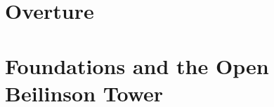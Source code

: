 \documentclass[11pt]{memoir}
\begin{document}
\part*{Overture}



%
%
%


%
%
%
%

\part{Foundations and the Open Beilinson Tower}
\label{part:foundations-beilinson-tower}%

\label{ch:theorem-h-off-koszul-platonic}%
\label{ch:topologization-chain-level-platonic}%

\label{ch:phi-universal-trace}%
\label{ch:ht-boundary}%
\label{ch:kontsevich-integral}%
\label{ch:ym-boundary-theory}%
\label{ch:ym-instanton-screening}%
\end{document}
